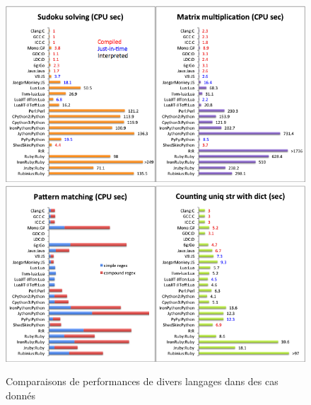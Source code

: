 \documentclass[a4paper]{memoir}
\begin{document}
			\begin{figure}[H]
				\begin{center}
					\includegraphics[scale=0.5]{img/AnalyseLangage1.png}
					\includegraphics[scale=0.5]{img/AnalyseLangage2.png} 
				\end{center}
				\label{fig:analyse}
				\caption{Comparaisons de performances de divers langages dans des cas donnés}
			\end{figure}
			
\end{document}
